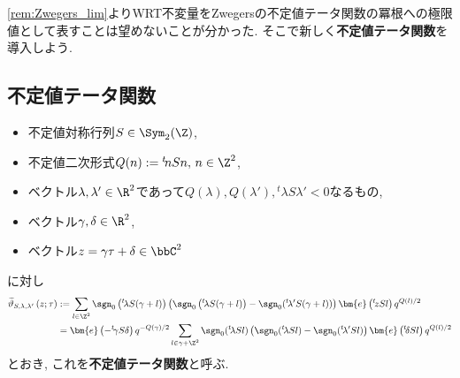 \documentclass[11pt,b5paper,oneside,lualatex]{ltjsarticle} %
\numberwithin{equation}{section} %
\begin{document}
\cref{rem:Zwegers_lim}よりWRT不変量をZwegersの不定値テータ関数の冪根への極限値として表すことは望めないことが分かった. 
そこで新しく\textbf{不定値テータ関数}を導入しよう. 


\subsection{不定値テータ関数} \label{subsec:indef_false_theta}



\begin{dfn} \label{dfn:indef_false_theta}
	\leavevmode %
	\begin{itemize}
		\item 不定値対称行列$ S \in \Sym_2(\Z) $,
		\item 不定値二次形式$ Q(n) := {}^t\!n S n, \, n \in \Z^2 $,
		\item ベクトル$ \lambda, \lambda' \in \R^2 $であって$ Q(\lambda), Q(\lambda'), {}^t\!\lambda S \lambda' < 0 $なるもの,
		\item ベクトル$ \gamma, \delta \in \R^2 $,
		\item ベクトル$ z = \gamma \tau + \delta \in \bbC^2 $
	\end{itemize}
	に対し
	\begin{align}
		\widetilde{\vartheta}_{S, \lambda, \lambda'} \left( z; \tau \right)
		&:=
		\sum_{l \in \Z^2}
		\sgn_0 \left( {}^t\!\lambda S (\gamma + l) \right)
		\left(\sgn_0 \left( {}^t\!\lambda S (\gamma + l) \right) - \sgn_0( {}^t\!\lambda' S (\gamma + l) ) \right)
		\bm{e} \left( {}^t\!z S l \right) q^{Q(l)/2}
		\\
		&=
		\bm{e} \left( -{}^t\!\gamma S \delta \right) q^{-Q(\gamma)/2}		
		\sum_{l \in \gamma + \Z^2}
		\sgn_0( {}^t\!\lambda S l )
		\left( \sgn_0( {}^t\!\lambda S l ) - \sgn_0( {}^t\!\lambda' S l ) \right)
		\bm{e} \left( {}^t\!\delta S l \right) q^{Q(l)/2}
	\end{align}
	とおき, これを\textbf{不定値テータ関数}と呼ぶ. 
\end{dfn}
\end{document}
